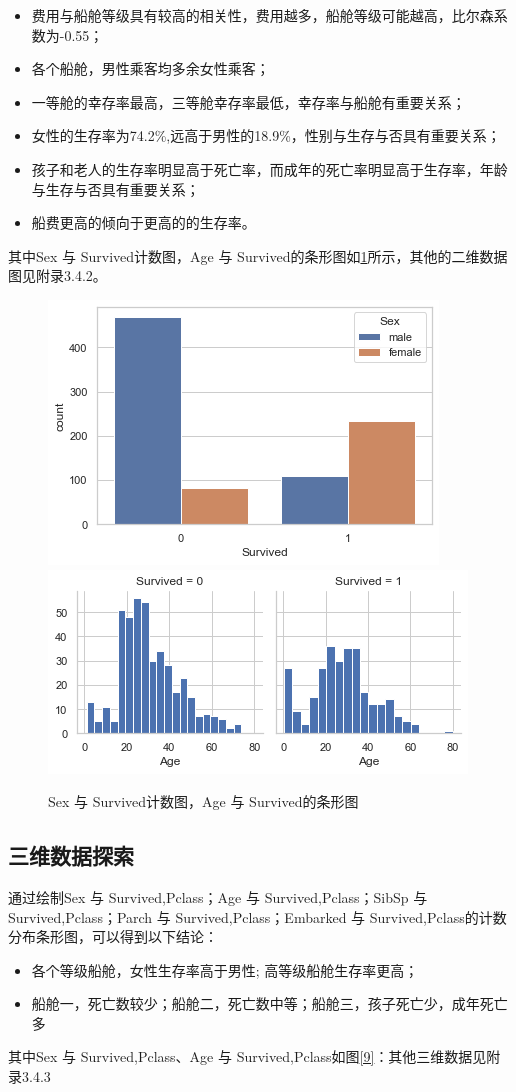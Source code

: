 \begin{itemize}
	\item 费用与船舱等级具有较高的相关性，费用越多，船舱等级可能越高，比尔森系数为-0.55；
	\item 各个船舱，男性乘客均多余女性乘客；
	\item 一等舱的幸存率最高，三等舱幸存率最低，幸存率与船舱有重要关系；
	\item  女性的生存率为74.2\%,远高于男性的18.9\%，性别与生存与否具有重要关系；
	\item 孩子和老人的生存率明显高于死亡率，而成年的死亡率明显高于生存率，年龄与生存与否具有重要关系；
	\item 船费更高的倾向于更高的的生存率。
\end{itemize}
其中Sex 与 Survived计数图，Age 与 Survived的条形图如\ref{7}所示，其他的二维数据图见附录3.4.2。
		\begin{figure}[H]
	\centering
	\includegraphics[scale=0.5,angle=0]{images/7.png}\includegraphics[scale=0.65,angle=0]{images/8.png}
	\caption{Sex 与 Survived计数图，Age 与 Survived的条形图}
	\label{7}
\end{figure}	

\subsection{三维数据探索}
通过绘制Sex 与 Survived,Pclass；Age 与 Survived,Pclass；SibSp 与 Survived,Pclass；Parch 与 Survived,Pclass；Embarked 与 Survived,Pclass的计数分布条形图，可以得到以下结论：
\begin{itemize}
	\item 各个等级船舱，女性生存率高于男性; 高等级船舱生存率更高；
	\item 船舱一，死亡数较少；船舱二，死亡数中等；船舱三，孩子死亡少，成年死亡多
\end{itemize}	
其中Sex 与 Survived,Pclass、Age 与 Survived,Pclass如图\ref{9}：其他三维数据见附录3.4.3

